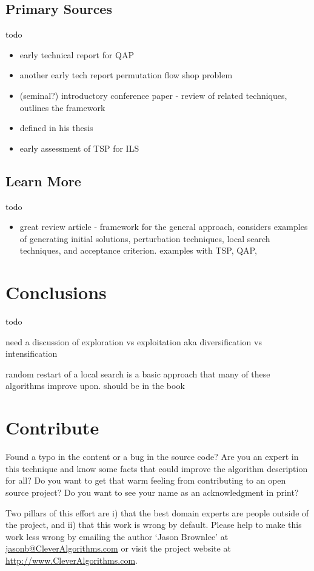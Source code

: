 \documentclass[a4paper, 11pt]{article}
\makeatletter
\newcommand{\myreportauthor}{Jason Brownlee}
\newcommand{\myreportemail}{jasonb@CleverAlgorithms.com}
\newcommand{\myreportwebsite}{http://www.CleverAlgorithms.com}
\makeatother
\begin{document}
\subsection{Primary Sources}
todo

\begin{itemize}
	\item early technical report \cite{Stuetzle1999} for QAP
	\item another early tech report \cite{Stutzle1998a} permutation flow shop problem
	\item (seminal?) introductory conference paper \cite{Lourenco2001} - review of related techniques, outlines the framework
	\item defined in his thesis \cite{Stutzle1998}
	\item early assessment of TSP for ILS \cite{Stutzle1999}
\end{itemize}

% 
% 
\subsection{Learn More}
todo

\begin{itemize}
	\item great review article \cite{Ramalhinho-Lourenco2003} - framework for the general approach, considers examples of generating initial solutions, perturbation techniques, local search techniques, and acceptance criterion. examples with TSP, QAP, 
\end{itemize}

% 
% 
\section{Conclusions}
\label{sec:conclusions}
todo

need a discussion of exploration vs exploitation  aka diversification vs intensification

random restart of a local search is a basic approach that many of these algorithms improve upon. should be in the book 

% 
% 
\section{Contribute}
\label{sec:contribute}
Found a typo in the content or a bug in the source code? 
Are you an expert in this technique and know some facts that could improve the algorithm description for all?
Do you want to get that warm feeling from contributing to an open source project? 
Do you want to see your name as an acknowledgment in print?

Two pillars of this effort are i) that the best domain experts are people outside of the project, and ii) that this work is wrong by default. 
Please help to make this work less wrong by emailing the author `\myreportauthor' at \url{\myreportemail} or visit the project website at \url{\myreportwebsite}.



\end{document}
